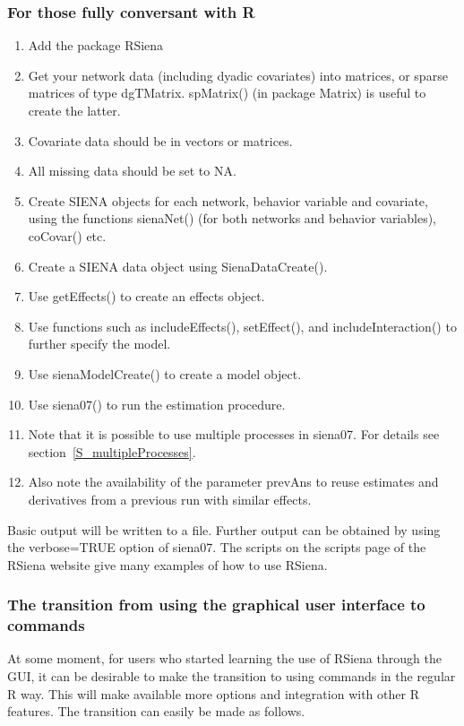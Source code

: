 \documentclass[a4paper,fleqn,11pt]{article}
\newcommand{\+}{\, + \,}
\newcommand{\sfn}[1]{\textsf{#1}}
\newcommand{\R}{{\sf R }}
\newcommand{\Rn}{{\sf R}}
\newcommand{\rs}{{\sf RSiena}}
\newcommand{\RS}{{\sf RSiena }}
\newcommand{\SI}{{\sf SIENA }}
\begin{document}
{\subsubsection{For those fully conversant with \Rn}
\label{S_fullyR}

\begin{enumerate}
\item Add the package \RS
\item Get your network data (including dyadic covariates)
   into matrices, or sparse matrices of type
  \sfn{dgTMatrix}. \sfn{spMatrix()} (in package \sfn{Matrix}) is useful to
  create the latter.
\item Covariate data should be in vectors or matrices.
\item All missing data should be set to NA.
\item Create \SI objects for each network, behavior variable and covariate,
  using the functions \sfn{sienaNet()} (for both networks and behavior
  variables), \sfn{coCovar()} etc.
\item Create a \SI data object using \sfn{SienaDataCreate()}.
\item Use \sfn{getEffects()} to create an effects object.
\item Use functions such as \sfn{includeEffects()}, \sfn{setEffect()},
 and \sfn{includeInteraction()} to further specify the model.
\item Use \sfn{sienaModelCreate()} to create a model object.
\item Use \sfn{siena07()} to run the estimation procedure.
\item Note that it is possible to use multiple processes in \sfn{siena07}. For
  details see section~\ref{S_multipleProcesses}.
\item Also note the availability of the parameter \sfn{prevAns} to reuse
  estimates and derivatives from a previous run with similar effects.
\end{enumerate}
Basic output will be written to a file. Further output can be obtained by using
the \sfn{verbose=TRUE} option of \sfn{siena07}.
The scripts on the scripts page of the \RS website give many examples of
how to use \rs.

\subsubsection{The transition from using the graphical user interface to commands}
\label{S_guiToR}

At some moment, for users who started learning the use of \RS through the GUI,
it can be desirable to make the transition to using commands in the regular \R way.
This will make available more options and integration with other \R features.
The transition can easily be made as follows.

}
\end{document}
